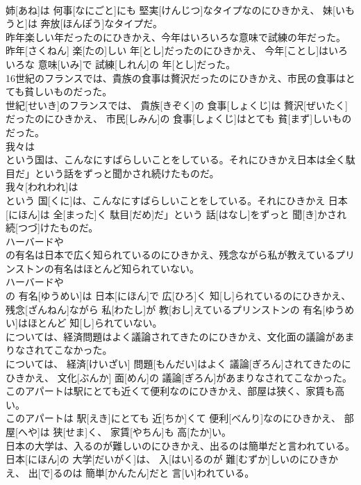 \documentclass[8pt]{extreport}
\begin{document}
\begin{CJK}{UTF8}{min}
\\	姉[あね]は 何事[なにごと]にも 堅実[けんじつ]なタイプなのにひきかえ、 妹[いもうと]は 奔放[ほんぽう]なタイプだ。
\\	昨年楽しい年だったのにひきかえ、今年はいろいろな意味で試練の年だった。	
\\	昨年[さくねん] 楽[たの]しい 年[とし]だったのにひきかえ、 今年[ことし]はいろいろな 意味[いみ]で 試練[しれん]の 年[とし]だった。
\\	16世紀のフランスでは、貴族の食事は贅沢だったのにひきかえ、市民の食事はとても貧しいものだった。	
\\	世紀[せいき]のフランスでは、 貴族[きぞく]の 食事[しょくじ]は 贅沢[ぜいたく]だったのにひきかえ、 市民[しみん]の 食事[しょくじ]はとても 貧[まず]しいものだった。
\\	我々は
\\	という国は、こんなにすばらしいことをしている。それにひきかえ日本は全く駄目だ」という話をずっと聞かされ続けたものだ。	
\\	我々[われわれ]は
\\	という 国[くに]は、こんなにすばらしいことをしている。それにひきかえ 日本[にほん]は 全[まった]く 駄目[だめ]だ」という 話[はなし]をずっと 聞[き]かされ 続[つづ]けたものだ。
\\	ハーバードや
\\	の有名は日本で広く知られているのにひきかえ、残念ながら私が教えているプリンストンの有名はほとんど知られていない。	
\\	ハーバードや 
\\	の 有名[ゆうめい]は 日本[にほん]で 広[ひろ]く 知[し]られているのにひきかえ、 残念[ざんねん]ながら 私[わたし]が 教[おし]えているプリンストンの 有名[ゆうめい]はほとんど 知[し]られていない。
\\	については、経済問題はよく議論されてきたのにひきかえ、文化面の議論があまりなされてこなかった。	
\\	については、 経済[けいざい] 問題[もんだい]はよく 議論[ぎろん]されてきたのにひきかえ、 文化[ぶんか] 面[めん]の 議論[ぎろん]があまりなされてこなかった。
\\	このアパートは駅にとても近くて便利なのにひきかえ、部屋は狭く、家賃も高い。	
\\	このアパートは 駅[えき]にとても 近[ちか]くて 便利[べんり]なのにひきかえ、 部屋[へや]は 狭[せま]く、 家賃[やちん]も 高[たか]い。
\\	日本の大学は、入るのが難しいのにひきかえ、出るのは簡単だと言われている。	
\\	日本[にほん]の 大学[だいがく]は、 入[はい]るのが 難[むずか]しいのにひきかえ、 出[で]るのは 簡単[かんたん]だと 言[い]われている。

\end{CJK}
\end{document}
